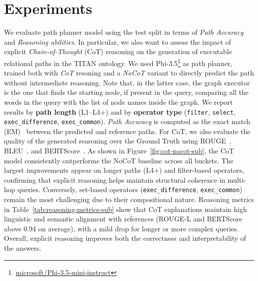 \documentclass[11pt]{article}
\begin{document}







\section{Experiments}
\label{sec:experiments}
We evaluate path planner model using the test split in terms of \textit{Path Accuracy} and \textit{Reasoning abilities}. In particular, we also want to assess the impact of explicit \textit{Chain-of-Thought} (CoT) reasoning on the generation of executable relational paths in the TITAN ontology.  
We used Phi-3.5\footnote{\url{microsoft/Phi-3.5-mini-instruct}} as path planner, trained both with \textit{CoT} resoning and a \textit{NoCoT} variant to directly predict the path without intermediate reasoning. Note that, in the latter case, the graph executor is the one that finds the starting node, if present in the query, comparing all the words in the query with the list of node names inside the graph. We report results by \textbf{path length} (L1–L4+) and by \textbf{operator type} (\texttt{filter}, \texttt{select}, \texttt{exec\_difference}, \texttt{exec\_common}).  
\textit{Path Accuracy} is computed as the exact match (EM)~\cite{rajpurkar2016squad} between the predicted and reference paths.  
For CoT, we also evaluate the quality of the generated reasoning over the Ground Truth using ROUGE~\cite{lin2004rouge,lin2003automatic}, BLEU~\cite{papineni2002bleu}, and BERTScore~\cite{zhang2019bertscore}. As shown in Figure~\ref{fig:cot-nocot-sub}, the CoT model consistently outperforms the NoCoT baseline across all buckets.  
The largest improvements appear on longer paths (L4+) and filter-based operators, confirming that explicit reasoning helps maintain structural coherence in multi-hop queries.  
Conversely, set-based operators (\texttt{exec\_difference}, \texttt{exec\_common}) remain the most challenging due to their compositional nature. Reasoning metrics in Table~\ref{tab:reasoning-metrics-sub} show that CoT explanations maintain high linguistic and semantic alignment with references (ROUGE-L and BERTScore above 0.94 on average), with a mild drop for longer or more complex queries. Overall, explicit reasoning improves both the correctness and interpretability of the answers.  
\end{document}
